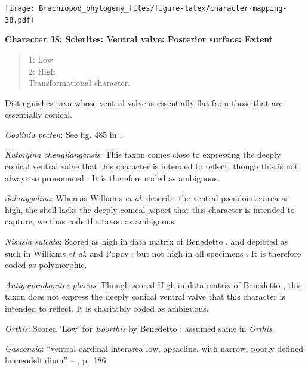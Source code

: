 \documentclass[openany]{book}
\theoremstyle{definition}
\theoremstyle{definition}
\theoremstyle{definition}
\theoremstyle{remark}
\begin{document}
\texttt{[image: Brachiopod\_phylogeny\_files/figure-latex/character-mapping-38.pdf]}

\textbf{Character 38: Sclerites: Ventral valve: Posterior surface:
Extent}

\begin{quote}
1: Low\\
2: High\\
Transformational character.
\end{quote}

Distinguishes taxa whose ventral valve is essentially flat from those
that are essentially conical.

\emph{Coolinia pecten}: See fig. 485 in
\citet{Williams2000BrachiopodaLinguliformea}.

\emph{Kutorgina chengjiangensis}: This taxon
\citetext{\citealp[see][fig.
129]{Williams2000BrachiopodaLinguliformea}; \citealp[fig.
1]{Popov1992TheCambrian}} comes close to expressing the deeply conical
ventral valve that this character is intended to reflect, though this is
not always so pronounced \citep[e.g.][fig.
125]{Williams2000BrachiopodaLinguliformea}. It is therefore coded as
ambiguous.

\emph{Salanygolina}: Whereas Williams \emph{et al}.
\citeyearpar[p.~156]{Williams2000BrachiopodaLinguliformea} describe the
ventral pseudointerarea as high, the shell lacks the deeply conical
aspect that this character is intended to capture; we thus code the
taxon as ambiguous.

\emph{Nisusia sulcata}: Scored as high in data matrix of Benedetto
\citeyearpar{Benedetto2009iChaniella}, and depicted as such in Williams
\emph{et al}. \citeyearpar[fig.
125]{Williams2000BrachiopodaLinguliformea} and Popov \citeyearpar[fig.
1]{Popov1992TheCambrian}; but not high in all specimens
\citep[e.g.][fig. 126]{Williams2000BrachiopodaLinguliformea}. It is
therefore coded as polymorphic.

\emph{Antigonambonites planus}: Though scored High in data matrix of
Benedetto \citeyearpar{Benedetto2009iChaniella}, this taxon
\citep[see][fig. 508]{Williams2000BrachiopodaLinguliformea} does not
express the deeply conical ventral valve that this character is intended
to reflect. It is charitably coded as ambiguous.

\emph{Orthis}: Scored `Low' for \emph{Eoorthis} by Benedetto
\citeyearpar{Benedetto2009iChaniella}; assumed same in \emph{Orthis}.

\emph{Gasconsia}: ``ventral cardinal interarea low, apsacline, with
narrow, poorly defined homeodeltidium'' --
\citet{Williams2000BrachiopodaLinguliformea}, p.~186.
\end{document}
